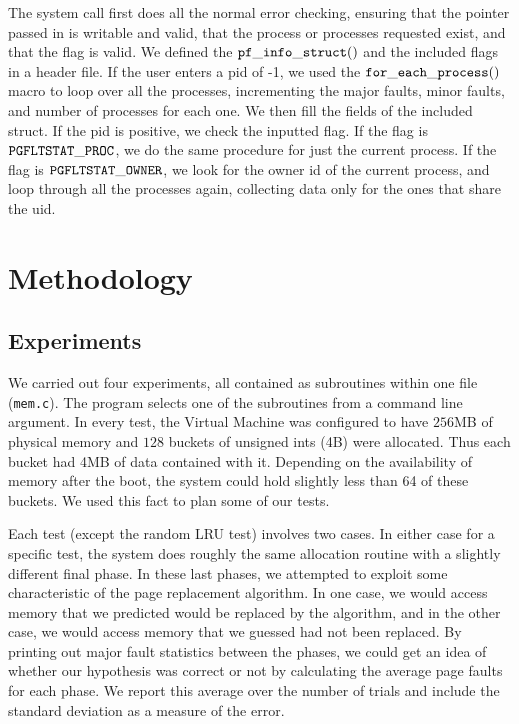 \documentclass[twocolumn]{article}
\begin{document}
The system call first does all the normal error checking, ensuring that the pointer passed in is writable and valid, that the process or processes requested exist, and that the flag is valid. We defined the ${\tt pf\_info\_struct()}$ 
and the included flags in a header file.  If the user enters a pid of -1, we used the ${\tt for\_each\_process()}$ macro to loop over all the processes, incrementing the major faults, minor faults, and number of processes for each one. We then fill the fields of the included struct. If the pid is positive, we check the inputted flag. If the flag is ${\tt PGFLTSTAT\_PROC}$, we do the same procedure for just the current process. If the flag is ${\tt PGFLTSTAT\_OWNER}$, we look for the owner id of the current process, and loop through all the processes again, collecting data only for the ones that share the uid. 

\section{Methodology}
\subsection{Experiments}

We carried out four experiments, all contained as subroutines within one file ({\tt mem.c}). The program selects one of the subroutines from a command line argument. In every test, the Virtual Machine was configured to have $256$MB of physical memory and $128$ buckets of unsigned ints (4B) were allocated. Thus each bucket had 4MB of data contained with it. Depending on the availability of memory after the boot, the system could hold slightly less than 64 of these buckets. We used this fact to plan some of our tests. 

Each test (except the random LRU test) involves two cases. In either case for a specific test, the system does roughly the same allocation routine with a slightly different final phase. In these last phases, we attempted to exploit some characteristic of the page replacement algorithm. In one case, we would access memory that we predicted would be replaced by the algorithm, and in the other case, we would access memory that we guessed had not been replaced. By printing out major fault statistics between the phases, we could get an idea of whether our hypothesis was correct or not by calculating the average page faults for each phase.  We report this average over the number of trials and include the standard deviation as a measure of the error. 
\end{document}
